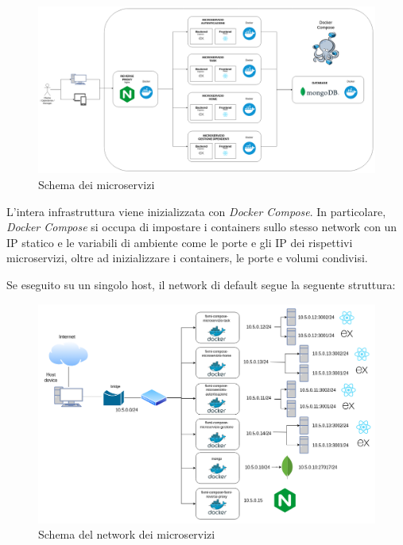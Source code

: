 \documentclass{report}
\begin{document}
\begin{figure}[H]
	\centering\includegraphics[width=1\textwidth]{images/diagramma_microservizi.png}
	Schema dei microservizi
\end{figure}

L'intera infrastruttura viene inizializzata con \textit{Docker Compose}. In particolare, \textit{Docker Compose} si occupa di impostare i containers sullo stesso network con un IP statico e le variabili di ambiente come le porte e gli IP dei rispettivi microservizi, oltre ad inizializzare i containers, le porte e volumi condivisi.

Se eseguito su un singolo host, il network di default segue la seguente struttura:
\begin{figure}[H]
	\centering\includegraphics[width=1\textwidth]{images/network.png}
	Schema del network dei microservizi
\end{figure}
\end{document}
